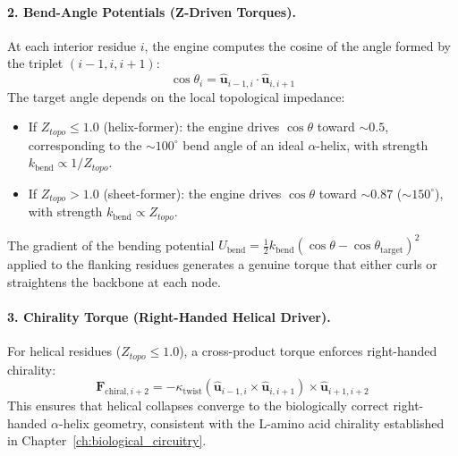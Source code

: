 \paragraph{2. Bend-Angle Potentials (Z-Driven Torques).}
At each interior residue $i$, the engine computes the cosine of the angle formed by the triplet $(i{-}1, i, i{+}1)$:
\begin{equation}
    \cos\theta_i = \hat{\mathbf{u}}_{i-1,i} \cdot \hat{\mathbf{u}}_{i,i+1}
    \label{eq:bend_angle}
\end{equation}
The target angle depends on the local topological impedance:
\begin{itemize}
    \item If $Z_{topo} \leq 1.0$ (helix-former): the engine drives $\cos\theta$ toward $\sim 0.5$, corresponding to the $\sim 100^\circ$ bend angle of an ideal $\alpha$-helix, with strength $k_{\text{bend}} \propto 1/Z_{topo}$.
    \item If $Z_{topo} > 1.0$ (sheet-former): the engine drives $\cos\theta$ toward $\sim 0.87$ ($\sim 150^\circ$), with strength $k_{\text{bend}} \propto Z_{topo}$.
\end{itemize}
The gradient of the bending potential $U_{\text{bend}} = \tfrac{1}{2} k_{\text{bend}} (\cos\theta - \cos\theta_{\text{target}})^2$ applied to the flanking residues generates a genuine torque that either curls or straightens the backbone at each node.

\paragraph{3. Chirality Torque (Right-Handed Helical Driver).}
For helical residues ($Z_{topo} \leq 1.0$), a cross-product torque enforces right-handed chirality:
\begin{equation}
    \mathbf{F}_{\text{chiral},i+2} = -\kappa_{\text{twist}} \left( \hat{\mathbf{u}}_{i-1,i} \times \hat{\mathbf{u}}_{i,i+1} \right) \times \hat{\mathbf{u}}_{i+1,i+2}
    \label{eq:chirality_torque}
\end{equation}
This ensures that helical collapses converge to the biologically correct right-handed $\alpha$-helix geometry, consistent with the L-amino acid chirality established in Chapter~\ref{ch:biological_circuitry}.

